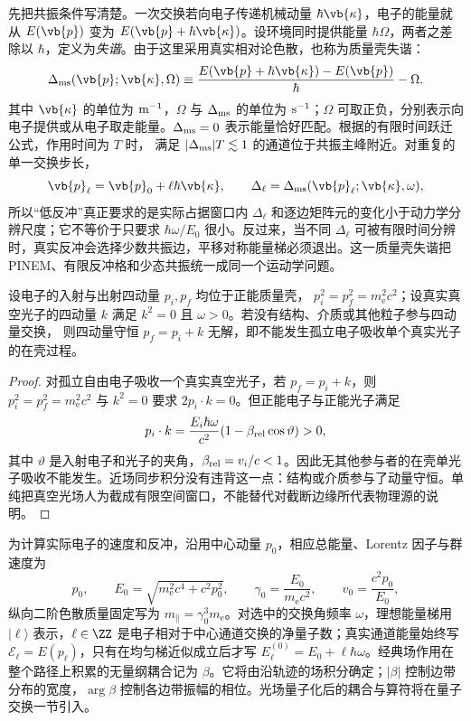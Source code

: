 先把共振条件写清楚。一次交换若向电子传递机械动量 $\hbar\vb{\kappa}$，电子的能量就从 $E(\vb{p})$ 变为 $E(\vb{p}+\hbar\vb{\kappa})$。设环境同时提供能量 $\hbar\Omega$，两者之差除以 $\hbar$，定义为\emph{失谐}。由于这里采用真实相对论色散，也称为质量壳失谐：
\begin{equation}
{
\Delta_{\rm ms}(\vb{p};\vb{\kappa},\Omega)
\equiv
\frac{
E(\vb{p}+\hbar\vb{\kappa})-E(\vb{p})
}{\hbar}
-\Omega .}
\label{eq:free_electron_exact_mass_shell_mismatch}
\end{equation}
其中 $\vb{\kappa}$ 的单位为 ${\rm m^{-1}}$，$\Omega$ 与 $\Delta_{\rm ms}$ 的单位为 ${\rm s^{-1}}$；$\Omega$ 可取正负，分别表示向电子提供或从电子取走能量。$\Delta_{\rm ms}=0$ 表示能量恰好匹配。根据的有限时间跃迁公式，作用时间为 $T$ 时，
满足 $|\Delta_{\rm ms}|T\lesssim1$ 的通道位于共振主峰附近。对重复的单一交换步长，
\[
\vb{p}_\ell=\vb{p}_0+\ell\hbar\vb{\kappa},
\qquad
\Delta_\ell
=
\Delta_{\rm ms}(\vb{p}_\ell;\vb{\kappa},\omega),
\]
所以“低反冲”真正要求的是实际占据窗口内 $\Delta_\ell$ 和逐边矩阵元的变化小于动力学分辨尺度；它不等价于只要求 $\hbar\omega/E_0$ 很小。反过来，当不同 $\Delta_\ell$ 可被有限时间分辨时，真实反冲会选择少数共振边，平移对称能量梯必须退出。这一质量壳失谐把 PINEM、有限反冲格和少态共振统一成同一个运动学问题。

\begin{proposition}[孤立自由电子的单光子吸收禁戒]
设电子的入射与出射四动量 $p_i,p_f$ 均位于正能质量壳，
$p_i^2=p_f^2=m_{\mathrm e}^2c^2$；设真实真空光子的四动量 $k$ 满足
$k^2=0$ 且 $\omega>0$。若没有结构、介质或其他粒子参与四动量交换，
则四动量守恒 $p_f=p_i+k$ 无解，即不能发生孤立电子吸收单个真实光子的在壳过程。
\end{proposition}
\begin{proof}
对孤立自由电子吸收一个真实真空光子，若 $p_f=p_i+k$，则 $p_i^2=p_f^2=m_{\mathrm e}^2c^2$ 与 $k^2=0$ 要求 $2p_i\cdot k=0$。但正能电子与正能光子满足
\begin{equation*}
 p_i\cdot k=\frac{E_i\hbar\omega}{c^2}
 (1-\beta_{\rm rel}\cos\vartheta)>0,
\end{equation*}
其中 $\vartheta$ 是入射电子和光子的夹角，$\beta_{\rm rel}=v_i/c<1$。因此无其他参与者的在壳单光子吸收不能发生。近场同步积分没有违背这一点：结构或介质参与了动量守恒。单纯把真空光场人为截成有限空间窗口，不能替代对截断边缘所代表物理源的说明。
\end{proof}

为计算实际电子的速度和反冲，沿用中心动量 $p_0$，相应总能量、Lorentz 因子与群速度为
\begin{equation*}
 p_0,\qquad E_0=\sqrt{m_{\mathrm e}^2c^4+c^2p_0^2},\qquad
 \gamma_0=\frac{E_0}{m_{\mathrm e} c^2},\qquad
 v_0=\frac{c^2p_0}{E_0},
\end{equation*}
纵向二阶色散质量固定写为 $m_\parallel=\gamma_0^3m_{\mathrm e}$。对选中的交换角频率 $\omega$，理想能量梯用 $|\ell\rangle$ 表示，$\ell\in\ZZ$ 是电子相对于中心通道交换的净量子数；真实通道能量始终写 $\mathcal E_\ell=E(p_\ell)$，只有在均匀梯近似成立后才写 $E_\ell^{(0)}=E_0+\ell\hbar\omega$。经典场作用在整个路径上积累的无量纲耦合记为 $\beta$。它将由沿轨迹的场积分确定；$|\beta|$ 控制边带分布的宽度，$\arg\beta$ 控制各边带振幅的相位。光场量子化后的耦合与算符将在量子交换一节引入。

